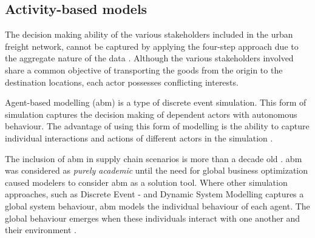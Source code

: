 
\subsection{Activity-based models}
The decision making ability of the various stakeholders included in the urban freight network, cannot be captured by applying the four-step approach due to the aggregate nature of the data \citep{anand2012city}. Although the various stakeholders involved share a common objective of transporting the goods from the origin to the destination locations, each actor possesses conflicting interests.

Agent-based modelling (\acrshort{abm}) is a type of discrete event simulation. This form of simulation captures the decision making of dependent actors with autonomous behaviour. The advantage of using this form of modelling is the ability to capture individual interactions and actions of different actors in the simulation \citep{guajardo2016review}.

The inclusion of \acrshort{abm} in supply chain scenarios is more than a decade old \citep{anand2014ontology}. \acrshort{abm} was considered as \textit{purely academic} until the need for global business optimization caused modelers to consider \acrshort{abm} as a solution tool. Where other simulation approaches, such as Discrete Event - and Dynamic System Modelling captures a global system behaviour, \acrshort{abm} models the individual behaviour of each agent. The global behaviour emerges when these individuals interact with one another and their environment \citep{borshchev2004system}.

